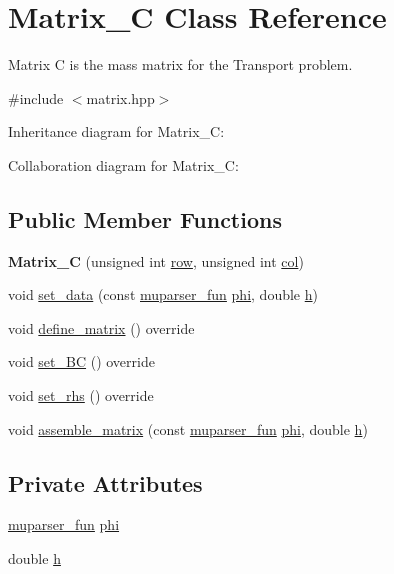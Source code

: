 \hypertarget{classMatrix__C}{}\section{Matrix\+\_\+C Class Reference}
\label{classMatrix__C}


Matrix C is the mass matrix for the Transport problem.  




{\ttfamily \#include $<$matrix.\+hpp$>$}



Inheritance diagram for Matrix\+\_\+C\+:


Collaboration diagram for Matrix\+\_\+C\+:
\subsection*{Public Member Functions}
\begin{DoxyCompactItemize}
\item 
\mbox{\label{classMatrix__C_a9e4a2ba41703e9547e7fa8fccf041966}} 
{\bfseries Matrix\+\_\+C} (unsigned int \hyperlink{classAbstractMatrix_a27fb46bf2853d4927d92a81b8b7773fb}{row}, unsigned int \hyperlink{classAbstractMatrix_af3ad3551ce094979488cef5df0e4fc1d}{col})
\item 
void \hyperlink{classMatrix__C_ae05f7fd6edf4816b2703123845422e37}{set\+\_\+data} (const \hyperlink{classmuparser__fun}{muparser\+\_\+fun} \hyperlink{classMatrix__C_a35d4d4197169e42d19a30fc6acca94bf}{phi}, double \hyperlink{classMatrix__C_ac381c022ef4080ac749c69d92a9f5927}{h})
\item 
void \hyperlink{classMatrix__C_a062ab76d181505d1db2e391f02152376}{define\+\_\+matrix} () override
\item 
void \hyperlink{classMatrix__C_a9235c2dbf2853fae4122251726a7efce}{set\+\_\+\+BC} () override
\item 
void \hyperlink{classMatrix__C_af305bfe533e702d629df3fb0409bc8d2}{set\+\_\+rhs} () override
\item 
void \hyperlink{classMatrix__C_a7c8ebcbeec03800cd3d06a764406c0db}{assemble\+\_\+matrix} (const \hyperlink{classmuparser__fun}{muparser\+\_\+fun} \hyperlink{classMatrix__C_a35d4d4197169e42d19a30fc6acca94bf}{phi}, double \hyperlink{classMatrix__C_ac381c022ef4080ac749c69d92a9f5927}{h})
\end{DoxyCompactItemize}
\subsection*{Private Attributes}
\begin{DoxyCompactItemize}
\item 
\hyperlink{classmuparser__fun}{muparser\+\_\+fun} \hyperlink{classMatrix__C_a35d4d4197169e42d19a30fc6acca94bf}{phi}
\item 
double \hyperlink{classMatrix__C_ac381c022ef4080ac749c69d92a9f5927}{h}
\end{DoxyCompactItemize}
